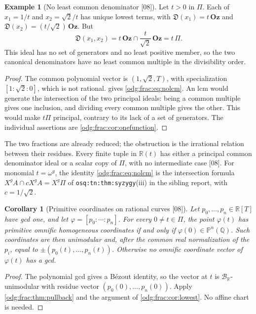 \documentclass[11pt,oneside]{article}
\numberwithin{equation}{section}
\newtheorem{corollary}[corollary]{Corollary}
\theoremstyle{definition}
\newtheorem{example}[example]{Example}
\theoremstyle{remark}
\newcommand{\Oz}{\mathbf{Oz}}
\newcommand{\Q}{\mathbb Q}
\newcommand{\R}{\mathbb R}
\newcommand{\BR}{\mathcal B_{\R}}
\newcommand{\src}[1]{\textup{\textsf{\small[#1]}}}
\newcommand{\replabel}[1]{\nolinkurl{#1}}
\newcommand{\Den}{\mathfrak D}
\begin{document}
\begin{example}[No least common denominator \src{08}]\label{odg:frac:ex:nolcm}
Let $t>0$ in $\Pi$. Each of $x_1=1/t$ and $x_2=\sqrt2/t$ has unique lowest
terms, with $\Den(x_1)=t\,\Oz$ and $\Den(x_2)=(t/\sqrt2)\,\Oz$. But
\begin{equation}\label{odg:frac:eq:nolcm}
 \Den(x_1,x_2)=t\,\Oz\cap\frac t{\sqrt2}\,\Oz=t\,\Pi .
\end{equation}
This ideal has no set of generators and no least positive member, so the two
canonical denominators have no least common multiple in the divisibility order.
\end{example}
\begin{proof}
The common polynomial vector is $(1,\sqrt2,T)$, with specialization
$[1:\sqrt2:0]$, which is not rational.  gives
\eqref{odg:frac:eq:nolcm}. An lcm would generate the intersection of the two
principal ideals: being a common multiple gives one inclusion, and dividing
every common multiple gives the other. This would make $t\Pi$ principal,
contrary to its lack of a set of generators. The individual assertions are
\cref{odg:frac:cor:onefunction}.
\end{proof}

The two fractions are already reduced; the obstruction is the irrational
relation between their residues. Every finite tuple in $\R(t)$ has either a
principal common denominator ideal or a scalar copy of $\Pi$, with no
intermediate case \src{08}. For monomial $t=\omega^g$, the identity
\eqref{odg:frac:eq:nolcm} is the intersection formula
$X^gA\cap cX^gA=X^g\Pi$ of \replabel{osq:tn:thm:syzygy}(iii) in the sibling
report, with $c=1/\sqrt2$.

\begin{corollary}[Primitive coordinates on rational curves \src{08}]\label{odg:frac:cor:curves}
Let $p_0,\ldots,p_n\in\R[T]$ have gcd one, and let
$\varphi=[p_0:\cdots:p_n]$. For every $0\ne t\in\Pi$, the point $\varphi(t)$ has
primitive omnific homogeneous coordinates if and only if
$\varphi(0)\in\mathbb P^n(\Q)$. Such coordinates are then unimodular and, after
the common real normalization of the $p_i$, equal to
$\pm(p_0(t),\ldots,p_n(t))$. Otherwise no omnific coordinate vector of
$\varphi(t)$ has a gcd.
\end{corollary}
\begin{proof}
The polynomial gcd gives a B\'ezout identity, so the vector at $t$ is
$\BR$-unimodular with residue vector $(p_0(0),\ldots,p_n(0))$. Apply
\cref{odg:frac:thm:pullback} and the argument of \cref{odg:frac:cor:lowest}. No
affine chart is needed.
\end{proof}
\end{document}

